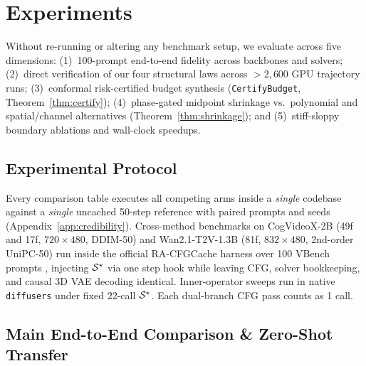 \section{Experiments}
\label{sec:experiments}

Without re-running or altering any benchmark setup, we evaluate \method{} across five dimensions: (1)~100-prompt end-to-end fidelity across backbones and solvers; (2)~direct verification of our four structural laws across $>2{,}600$ GPU trajectory runs; (3)~conformal risk-certified budget synthesis (\texttt{CertifyBudget}, Theorem~\ref{thm:certify}); (4)~phase-gated midpoint shrinkage vs.\ polynomial and spatial/channel alternatives (Theorem~\ref{thm:shrinkage}); and (5)~stiff-sloppy boundary ablations and wall-clock speedups.

\subsection{Experimental Protocol}
\label{sec:exp_setup}
Every comparison table executes all competing arms inside a \emph{single} codebase against a \emph{single} uncached 50-step reference with paired prompts and seeds (Appendix~\ref{app:credibility}). Cross-method benchmarks on CogVideoX-2B \citep{yang2025cogvideox} (49f and 17f, $720{\times}480$, DDIM-50) and Wan2.1-T2V-1.3B \citep{wan2025wan} (81f, $832{\times}480$, 2nd-order UniPC-50) run inside the official RA-CFGCache harness \citep{liu2026racfgcache} over 100 VBench prompts \citep{huang2024vbench}, injecting $\mathcal{S}^\star$ via one step hook while leaving CFG, solver bookkeeping, and causal 3D VAE decoding identical. Inner-operator sweeps run in native \texttt{diffusers} under fixed 22-call $\mathcal{S}^\star$. Each dual-branch CFG pass counts as 1 call.

\subsection{Main End-to-End Comparison \& Zero-Shot Transfer}
\label{sec:exp_main}

